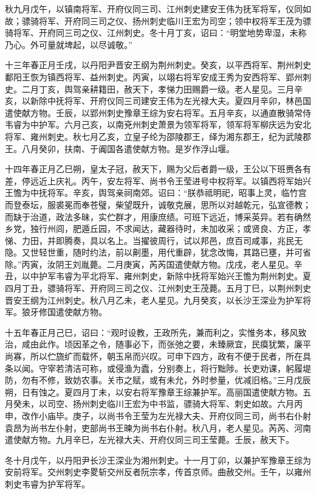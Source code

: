 \documentclass[12pt,UTF8]{ctexbook}
\begin{document}
秋九月戊午，以镇南将军、开府仪同三司、江州刺史建安王伟为抚军将军，仪同如故；骠骑将军、开府同三司之仪、扬州刺史临川王宏为司空；领中权将军王茂为骠骑将军、开府同三司之仪、江州刺史。冬十月丁亥，诏曰：“明堂地势卑湿，未称乃心。外可量就埤起，以尽诚敬。”

十三年春正月壬戌，以丹阳尹晋安王纲为荆州刺史。癸亥，以平西将军、荆州刺史鄱阳王恢为镇西将军、益州刺史。丙寅，以翊右将军安成王秀为安西将军、郢州刺史。二月丁亥，舆驾亲耕籍田，赦天下，孝悌力田赐爵一级。老人星见。三月辛亥，以新除中抚将军、开府仪同三司建安王伟为左光禄大夫。夏四月辛卯，林邑国遣使献方物。壬辰，以郢州刺史豫章王综为安右将军。五月辛亥，以通直散骑常侍韦睿为中护军。六月己亥，以南兗州刺史萧景为领军将军，领军将军柳庆远为安北将军、雍州刺史。秋七月乙亥，立皇子纶为邵陵郡王，绎为湘东郡王，纪为武陵郡王。八月癸卯，扶南、于阗国各遣使献方物。是岁作浮山堰。

十四年春正月乙巳朔，皇太子冠，赦天下，赐为父后者爵一级，王公以下班赉各有差，停远近上庆礼。丙午，安左将军、尚书令王莹进号中权将军。以镇西将军始兴王憺为中抚将军。辛亥，舆驾亲祠南郊。诏曰：“朕恭祗明祀，昭事上灵，临竹宫而登泰坛，服裘冕而奉苍璧，柴望既升，诚敬克展，思所以对越乾元，弘宣德教；而缺于治道，政法多昧，实伫群才，用康庶绩。可班下远近，博采英异。若有确然乡党，独行州闾，肥遁丘园，不求闻达，藏器待时，未加收采；或贤良、方正，孝悌、力田，并即腾奏，具以名上。当擢彼周行，试以邦邑，庶百司咸事，兆民无隐。又世轻世重，随时约法，前以劓墨，用代重辟，犹念改悔，其路已壅，并可省除。”丙寅，汝阴王刘胤薨。二月庚寅，芮芮国遣使献方物。戊戌，老人星见。辛丑，以中护军韦睿为平北将军、雍州刺史，新除中抚将军始兴王憺为荆州刺史。夏四月丁丑，骠骑将军、开府同三司之仪、江州刺史王茂薨。五月丁巳，以荆州刺史晋安王纲为江州刺史。秋八月乙未，老人星见。九月癸亥，以长沙王深业为护军将军。狼牙修国遣使献方物。

十五年春正月己巳，诏曰：“观时设教，王政所先，兼而利之，实惟务本，移风致治，咸由此作。顷因革之令，随事必下，而张弛之要，未臻厥宜，民瘼犹繁，廉平尚寡，所以伫旒纩而载怀，朝玉帛而兴叹。可申下四方，政有不便于民者，所在具条以闻。守宰若清洁可称，或侵渔为蠹，分别奏上，将行黜陟。长吏劝课，躬履堤防，勿有不修，致妨农事。关市之赋，或有未允，外时参量，优减旧格。”三月戊辰朔，日有蚀之。夏四月丁未，以安右将军豫章王综兼护军。高丽国遣使献方物。五月癸未，以司空、扬州刺史临川王宏为中书监，骠骑大将军、刺史如故。六月丙申，改作小庙毕。庚子，以尚书令王莹为左光禄大夫、开府仪同三司，尚书右仆射袁昂为尚书左仆射，吏部尚书王暕为尚书右仆射。秋八月，老人星见。芮芮、河南遣使献方物。九月辛巳，左光禄大夫、开府仪同三司王莹薨。壬辰，赦天下。

冬十月戊午，以丹阳尹长沙王深业为湘州刺史。十一月丁卯，以兼护军豫章王综为安前将军。交州刺史李畟斩交州反者阮宗孝，传首京师。曲赦交州。壬午，以雍州刺史韦睿为护军将军。
\end{document}
